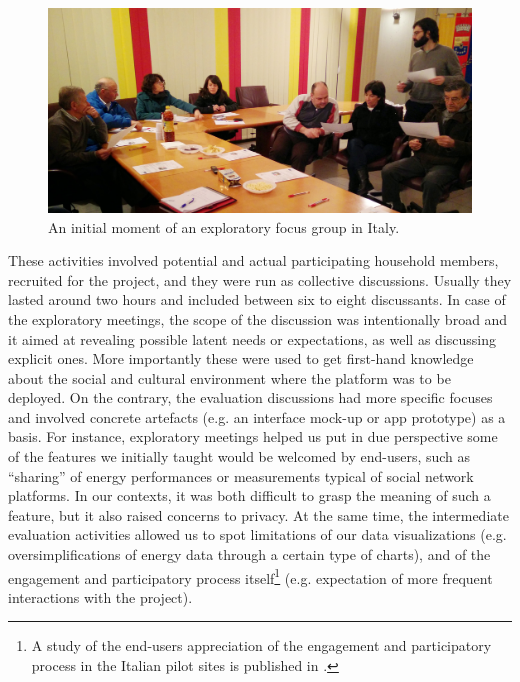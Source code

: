 %
%


%
\begin{figure}[t]
	\sidecaption[t]
	\includegraphics[width=.45\linewidth]{img/FocusGroup_TN.jpg}
	\caption{An initial moment of an exploratory focus group in Italy.}
	\label{fig:focusgroups}
\end{figure}


These activities involved potential and actual participating household members, recruited for the project, and they
were run as collective discussions. Usually they lasted around two hours and included between six to eight discussants.
In case of the exploratory meetings, the scope of the discussion was intentionally broad and it aimed at revealing possible latent
needs or expectations, as well as discussing explicit ones. More importantly these were used to get first-hand knowledge
about the social and cultural environment where the platform was to be deployed. On the contrary, the evaluation discussions
had more specific focuses and involved concrete artefacts (e.g. an interface mock-up or app prototype)
as a basis.
% 
For instance, exploratory meetings helped us put in due perspective some of the features we initially taught
would be welcomed by end-users, such as ``sharing'' of energy performances or measurements typical of social network platforms.
In our contexts, it was both difficult to grasp the meaning of such a feature, but it also raised
 concerns to privacy. At the same time, the intermediate evaluation activities allowed us to spot
limitations of our data visualizations (e.g. oversimplifications of energy data through a certain type of charts),
and of the engagement and participatory process itself\footnote{A study of the end-users appreciation of the engagement and participatory process in the Italian pilot sites
is published in \cite{capaccioli_exploring_2017}.}
(e.g. expectation of more frequent interactions with the project).

